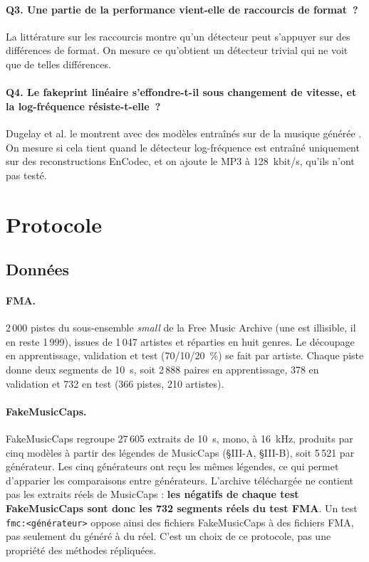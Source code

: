 \documentclass[a4paper, 11pt]{article}
\begin{document}
\paragraph{Q3. Une partie de la performance vient-elle de raccourcis de format~?} La littérature sur les
raccourcis \cite{geirhos2020shortcut, muller2021silence, muller2022generalize} montre qu'un détecteur peut
s'appuyer sur des différences de format. On mesure ce qu'obtient un détecteur trivial qui ne voit que de telles
différences.

\paragraph{Q4. Le fakeprint linéaire s'effondre-t-il sous changement de vitesse, et la log-fréquence
résiste-t-elle~?} Dugelay et al. le montrent avec des modèles entraînés sur de la musique générée
\cite{dugelay2026robustness}. On mesure si cela tient quand le détecteur log-fréquence est entraîné uniquement
sur des reconstructions EnCodec, et on ajoute le MP3 à 128~kbit/s, qu'ils n'ont pas testé.

\section{Protocole}
\label{sec:protocole}

\subsection{Données}
\label{sec:donnees}

\paragraph{FMA.} 2\,000 pistes du sous-ensemble \emph{small} de la Free Music Archive
\cite{defferrard2017fma} (une est illisible, il en reste 1\,999), issues de 1\,047 artistes et réparties en huit
genres. Le découpage en apprentissage, validation et test (70/10/20~\%) se fait par artiste. Chaque
piste donne deux segments de 10~s, soit 2\,888 paires en apprentissage, 378 en validation et 732 en test
(366 pistes, 210 artistes).

\paragraph{FakeMusicCaps.} FakeMusicCaps \cite{comanducci2024fakemusiccaps} regroupe 27\,605 extraits de 10~s,
mono, à 16~kHz, produits par cinq modèles à partir des légendes de MusicCaps \cite{agostinelli2023musiclm}
(§III-A, §III-B), soit 5\,521 par générateur. Les cinq générateurs ont reçu les mêmes légendes, ce qui permet
d'apparier les comparaisons entre générateurs. L'archive téléchargée ne contient pas les extraits réels de
MusicCaps : \textbf{les négatifs de chaque test FakeMusicCaps sont donc les 732 segments réels du test FMA}. Un
test \texttt{fmc:<générateur>} oppose ainsi des fichiers FakeMusicCaps à des fichiers FMA, pas seulement du
généré à du réel. C'est un choix de ce protocole, pas une propriété des méthodes répliquées.
\end{document}
